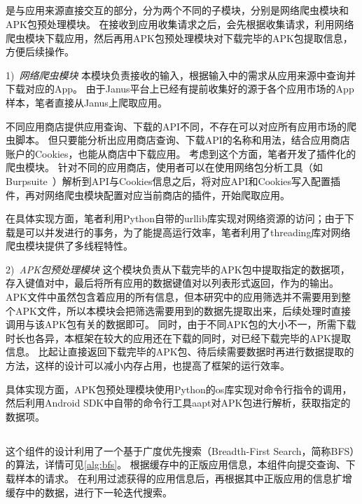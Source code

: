 \subsection{\componentA }
\componentA 是与应用来源直接交互的部分，分为两个不同的子模块，分别是网络爬虫模块和APK包预处理模块。
在接收到应用收集请求之后，\componentA 会先根据收集请求，利用网络爬虫模块下载应用，然后再用APK包预处理模块对下载完毕的APK包提取信息，方便后续操作。

1)\ \emph{网络爬虫模块} \quad
本模块负责接收\componentA 的输入，根据输入中的需求从应用来源中查询并下载对应的App。
由于Janus平台上已经有提前收集好的源于各个应用市场的App样本，笔者直接从Janus上爬取应用。

不同应用商店提供应用查询、下载的API不同，不存在可以对应所有应用市场的爬虫脚本。
但只要能分析出应用商店查询、下载API的名称和用法，结合应用商店账户的Cookies，也能从商店中下载应用。
考虑到这个方面，笔者开发了插件化的爬虫模块。
针对不同的应用商店，使用者可以在使用网络包分析工具（如Burpsuite~\cite{burpsuite}）解析到API与Cookies信息之后，将对应API和Cookies写入配置插件，再对网络爬虫模块配置对应当前商店的插件，开始爬取应用。

在具体实现方面，笔者利用Python自带的urllib库实现对网络资源的访问；由于下载是可以并发进行的事务，为了能提高运行效率，笔者利用了threading库对网络爬虫模块提供了多线程特性。

2)\ \emph{APK包预处理模块} \quad
这个模块负责从下载完毕的APK包中提取指定的数据项，存入键值对中，最后将所有应用的数据键值对以列表形式返回，作为\componentA 的输出。
APK文件中虽然包含着应用的所有信息，但本研究中的应用筛选并不需要用到整个APK文件，所以本模块会把筛选需要用到的数据先提取出来，后续处理时直接调用与该APK包有关的数据即可。
同时，由于不同APK包的大小不一，所需下载时长也各异，本框架在较大的应用还在下载的同时，对已经下载完毕的APK提取信息。
比起让\componentA 直接返回下载完毕的APK包、待后续需要数据时再进行数据提取的方法，这样的设计可以减小内存占用，也提高了框架的运行效率。

具体实现方面，APK包预处理模块使用Python的os库实现对命令行指令的调用，然后利用Android SDK中自带的命令行工具aapt对APK包进行解析，获取指定的数据项。


\subsection{\componentB }
这个组件的设计利用了一个基于广度优先搜索（Breadth-First Search，简称BFS）的算法，详情可见\autoref{alg:bfs}。
根据缓存中的正版应用信息，本组件向\componentA 提交查询、下载样本的请求。
在利用\componentC 过滤获得的应用信息后，再根据其中正版应用的信息扩增缓存中的数据，进行下一轮迭代搜索。


